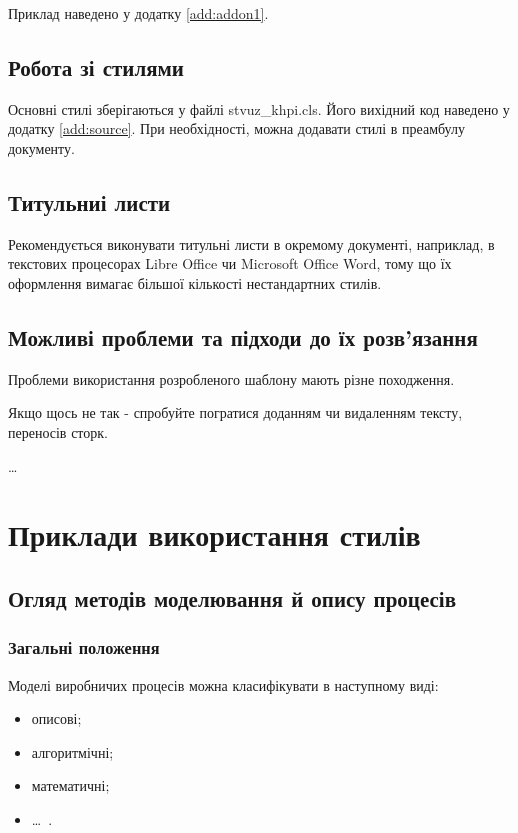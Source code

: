 Приклад наведено у додатку \ref{add:addon1}.

\subsection{Робота зі стилями}

Основні стилі зберігаються у файлі stvuz\_khpi.cls.
Його вихідний код наведено у додатку \ref{add:source}. При необхідності, можна
додавати стилі в преамбулу документу.

\subsection{Титульниі листи}

Рекомендується виконувати титульні листи в окремому документі, наприклад, в
текстових процесорах Libre Office чи Microsoft Office Word, тому що їх
оформлення вимагає більшої кількості нестандартних стилів.

\subsection{Можливі проблеми та підходи до їх розв'язання}

Проблеми використання розробленого шаблону мають різне походження.

Якщо щось не так - спробуйте погратися доданням чи видаленням тексту, переносів
сторк.

\begin{longEnumerate}
\item \ldots 
\end{longEnumerate}

\section{Приклади використання стилів}

\subsection{Огляд методів моделювання й опису процесів}
\subsubsection{Загальні положення}
Моделі виробничих процесів можна класифікувати в наступному виді:
\begin{itemize}
\item описові;
\item алгоритмічні;
\item математичні;
\item \dots~.
\end{itemize}

